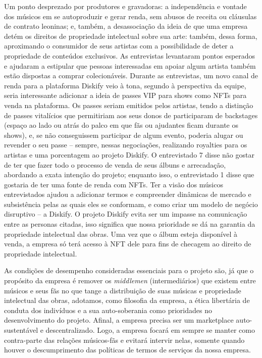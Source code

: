 \documentclass[onecolumn,12pt]{asme2ej}
\begin{document}
Um ponto desprezado por produtores e gravadoras: a independência e vontade dos músicos em se autoproduzir e gerar renda, sem abusos de receita ou cláusulas de contrato leoninas; e, também, a desassociação da ideia de que uma empresa detém os direitos de propriedade intelectual sobre sua arte: também, dessa forma, aproximando o consumidor de seus artistas com a possibilidade de deter a propriedade de conteúdos exclusivos. As entrevistas levantaram pontos esperados e ajudaram a estipular que pessoas interessadas em apoiar algum artista também estão dispostas a comprar colecionáveis. Durante as entrevistas, um novo canal de renda para a plataforma Diskify veio à tona, segundo à perspectiva da equipe, seria interessante adicionar a ideia de passes VIP para shows como NFTs para venda na plataforma. Os passes seriam emitidos pelos artistas, tendo a distinção de passes vitalícios que permitiriam aos seus donos de participaram de backstages (espaço ao lado ou atrás do palco em que fãs ou ajudantes ficam durante os shows), e, se não conseguissem participar de algum evento, poderia alugar ou revender o seu passe – sempre, nessas negociações, realizando royalties para os artistas e uma porcentagem ao projeto Diskify. O entrevistado 7 disse não gostar de ter que fazer todo o processo de venda de seus álbuns e arrecadação, abordando a exata intenção do projeto; enquanto isso, o entrevistado 1 disse que gostaria de ter uma fonte de renda com NFTs. Ter a visão dos músicos entrevistados ajudou a adicionar termos e compreender dinâmicas de mercado e subsistência pelas as quais eles se conformam, e como criar um modelo de negócio disruptivo – a Diskify. O projeto Diskify evita ser um impasse na comunicação entre as personas citadas, isso significa que nossa prioridade se dá na garantia da propriedade intelectual das obras. Uma vez que o álbum esteja disponível à venda, a empresa só terá acesso à NFT dele para fins de checagem ao direito de propriedade intelectual.

As condições de desempenho consideradas essenciais para o projeto são, já que o propósito da empresa é remover os {\it middlemen} (intermediários) que existem entre músicos e seus fãs no que tange a distribuição de suas músicas e propriedade intelectual das obras, adotamos, como filosofia da empresa, a ética libertária de conduta dos indivíduos e a sua auto-soberania como prioridades no desenvolvimento do projeto. Afinal, a empresa precisa ser um marketplace auto-sustentável e descentralizado. Logo, a empresa focará em sempre se manter como contra-parte das relações músicos-fãs e evitará intervir nelas, somente quando houver o descumprimento das políticas de termos de serviços da nossa empresa.
\end{document}
